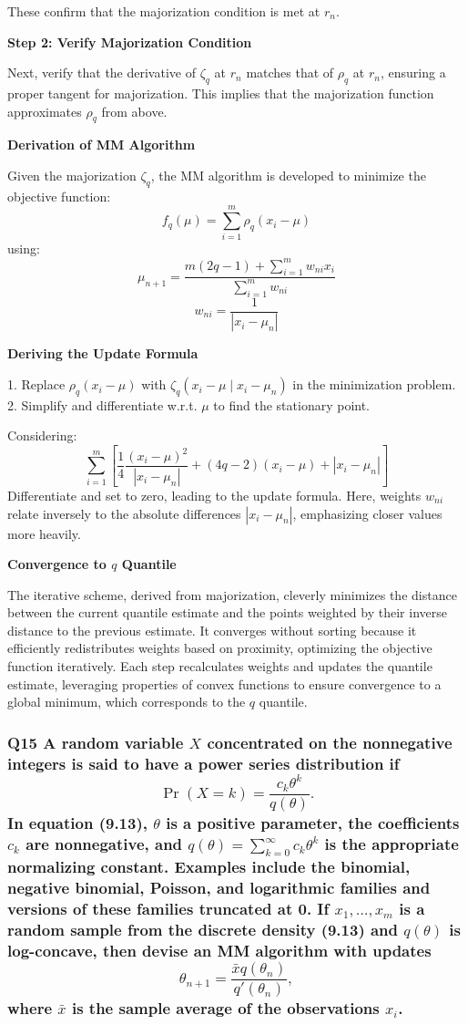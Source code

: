 \documentclass[8pt]{article}
\begin{document}
These confirm that the majorization condition is met at \(r_n\).

\textbf{Step 2: Verify Majorization Condition}

Next, verify that the derivative of \(\zeta_q\) at \(r_n\) matches that of \(\rho_q\) at \(r_n\), ensuring a proper tangent for majorization. This implies that the majorization function approximates \(\rho_q\) from above.

\textbf{Derivation of MM Algorithm}

Given the majorization \(\zeta_q\), the MM algorithm is developed to minimize the objective function:
\[
f_q(\mu) = \sum_{i=1}^m \rho_q(x_i - \mu)
\]
using:
\[
\mu_{n+1} = \frac{m(2q - 1) + \sum_{i=1}^m w_{ni} x_i}{\sum_{i=1}^m w_{ni}}
\]
\[
w_{ni} = \frac{1}{|x_i - \mu_n|}
\]

\textbf{Deriving the Update Formula}

1. Replace \(\rho_q(x_i - \mu)\) with \(\zeta_q(x_i - \mu \mid x_i - \mu_n)\) in the minimization problem.
2. Simplify and differentiate w.r.t. \(\mu\) to find the stationary point.

Considering:
\[
\sum_{i=1}^m \left[\frac{1}{4} \frac{(x_i - \mu)^2}{|x_i - \mu_n|} + (4q - 2)(x_i - \mu) + |x_i - \mu_n|\right]
\]
Differentiate and set to zero, leading to the update formula. Here, weights \(w_{ni}\) relate inversely to the absolute differences \(|x_i - \mu_n|\), emphasizing closer values more heavily.

\textbf{Convergence to \(q\) Quantile}

The iterative scheme, derived from majorization, cleverly minimizes the distance between the current quantile estimate and the points weighted by their inverse distance to the previous estimate. It converges without sorting because it efficiently redistributes weights based on proximity, optimizing the objective function iteratively. Each step recalculates weights and updates the quantile estimate, leveraging properties of convex functions to ensure convergence to a global minimum, which corresponds to the \(q\) quantile.

\subsubsection*{Q15 A random variable \(X\) concentrated on the nonnegative integers is said to have a power series distribution if
\[
\Pr(X = k) = \frac{c_k \theta^k}{q(\theta)}.
\]
In equation (9.13), \(\theta\) is a positive parameter, the coefficients \(c_k\) are nonnegative, and \(q(\theta) = \sum_{k=0}^\infty c_k \theta^k\) is the appropriate normalizing constant. Examples include the binomial, negative binomial, Poisson, and logarithmic families and versions of these families truncated at 0. If \(x_1, \ldots, x_m\) is a random sample from the discrete density (9.13) and \(q(\theta)\) is log-concave, then devise an MM algorithm with updates
\[
\theta_{n+1} = \frac{\bar{x} q(\theta_n)}{q'(\theta_n)},
\]
where \(\bar{x}\) is the sample average of the observations \(x_i\).}
\end{document}

